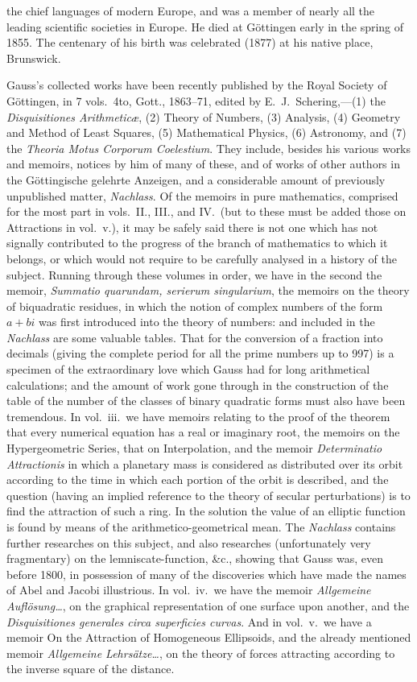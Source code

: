 \documentclass[11pt,a4paper]{article}
\begin{document}
the chief languages of modern Europe, and was a member of nearly all the leading scientific societies in Europe. He died at G\"{o}ttingen early in the spring of 1855. The centenary of his birth was celebrated (1877) at his native place, Brunswick.

Gauss's collected works have been recently published by the Royal Society of G\"{o}ttingen, in 7 vols.\ 4to, Gott., 1863--71, edited by E.\ J.\ Schering,---(1) the \textit{Disquisitiones Arithmetic\ae}, (2) Theory of Numbers, (3) Analysis, (4) Geometry and Method of Least Squares, (5) Mathematical Physics, (6) Astronomy, and (7) the \textit{Theoria Motus Corporum Coelestium}. They include, besides his various works and memoirs, notices by him of many of these, and of works of other authors in the G\"{o}ttingische gelehrte Anzeigen, and a considerable amount of previously unpublished matter, \textit{Nachlass}. Of the memoirs in pure mathematics, comprised for the most part in vols.~II., III., and IV.\ (but to these must be added those on Attractions in vol.~v.), it may be safely said there is not one which has not signally contributed to the progress of the branch of mathematics to which it belongs, or which would not require to be carefully analysed in a history of the subject. Running through these volumes in order, we have in the second the memoir, \textit{Summatio quarundam, serierum singularium}, the memoirs on the theory of biquadratic residues, in which the notion of complex numbers of the form $a + bi$ was first introduced into the theory of numbers: and included in the \textit{Nachlass} are some valuable tables. That for the conversion of a fraction into decimals (giving the complete period for all the prime numbers up to 997) is a specimen of the extraordinary love which Gauss had for long arithmetical calculations; and the amount of work gone through in the construction of the table of the number of the classes of binary quadratic forms must also have been tremendous. In vol.~iii.\ we have memoirs relating to the proof of the theorem that every numerical equation has a real or imaginary root, the memoirs on the Hypergeometric Series, that on Interpolation, and the memoir \textit{Determinatio Attractionis} in which a planetary mass is considered as distributed over its orbit according to the time in which each portion of the orbit is described, and the question (having an implied reference to the theory of secular perturbations) is to find the attraction of such a ring. In the solution the value of an elliptic function is found by means of the arithmetico-geometrical mean. The \textit{Nachlass} contains further researches on this subject, and also researches (unfortunately very fragmentary) on the lemniscate-function, \&c., showing that Gauss was, even before 1800, in possession of many of the discoveries which have made the names of Abel and Jacobi illustrious. In vol.~iv.\ we have the memoir \textit{Allgemeine Aufl\"{o}sung\ldots}, on the graphical representation of one surface upon another, and the \textit{Disquisitiones generales circa superficies curvas}. And in vol.~v.\ we have a memoir On the Attraction of Homogeneous Ellipsoids, and the already mentioned memoir \textit{Allgemeine Lehrs\"{a}tze\ldots}, on the theory of forces attracting according to the inverse square of the distance.
\end{document}
